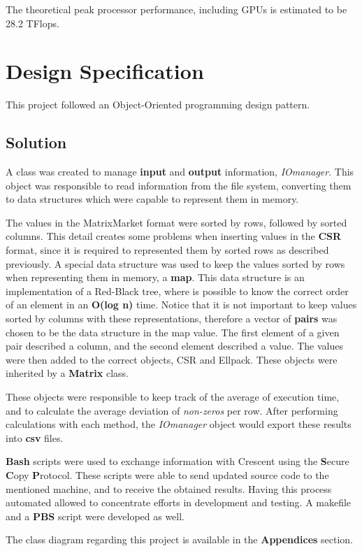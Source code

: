 \documentclass[12pt]{article}
\begin{document}
\par The theoretical peak processor performance, including GPUs is estimated to be 28.2 TFlops.

\section*{Design Specification}

\par This project followed an Object-Oriented programming design pattern.

\subsection*{Solution}

\par A class was created to manage \textbf{input} and \textbf{output} information, \textit{IOmanager}. This object was responsible to read information from the file system, converting them to data structures which were capable to represent them in memory. 
\par The values in the MatrixMarket format were sorted by rows, followed by sorted columns. This detail creates some problems when inserting values in the \textbf{CSR} format, since it is required to represented them by sorted rows as described previously. A special data structure was used to keep the values sorted by rows when representing them in memory, a \textbf{map}. This data structure is an implementation of a Red-Black tree, where is possible to know the correct order of an element in an \textbf{O(log n)} time. Notice that it is not important to keep values sorted by columns with these representations, therefore a vector of \textbf{pairs} was chosen to be the data structure in the map value. The first element of a given pair described a column, and the second element described a value. The values were then added to the correct objects, CSR and Ellpack. These objects were inherited by a \textbf{Matrix} class. 
\par These objects were responsible to keep track of the average of execution time, and to calculate the average deviation of \textit{non-zeros} per row. After performing calculations with each method, the \textit{IOmanager} object would export these results into \textbf{csv} files. 
\par \textbf{Bash} scripts were used to exchange information with Crescent using the \textbf{S}ecure \textbf{C}opy \textbf{P}rotocol. These scripts were able to send updated source code to the mentioned machine, and to receive the obtained results. Having this process automated allowed to concentrate efforts in development and testing. A makefile and a \textbf{PBS} script were developed as well.
\par The class diagram regarding this project is available in the \textbf{Appendices} section.
\end{document}
